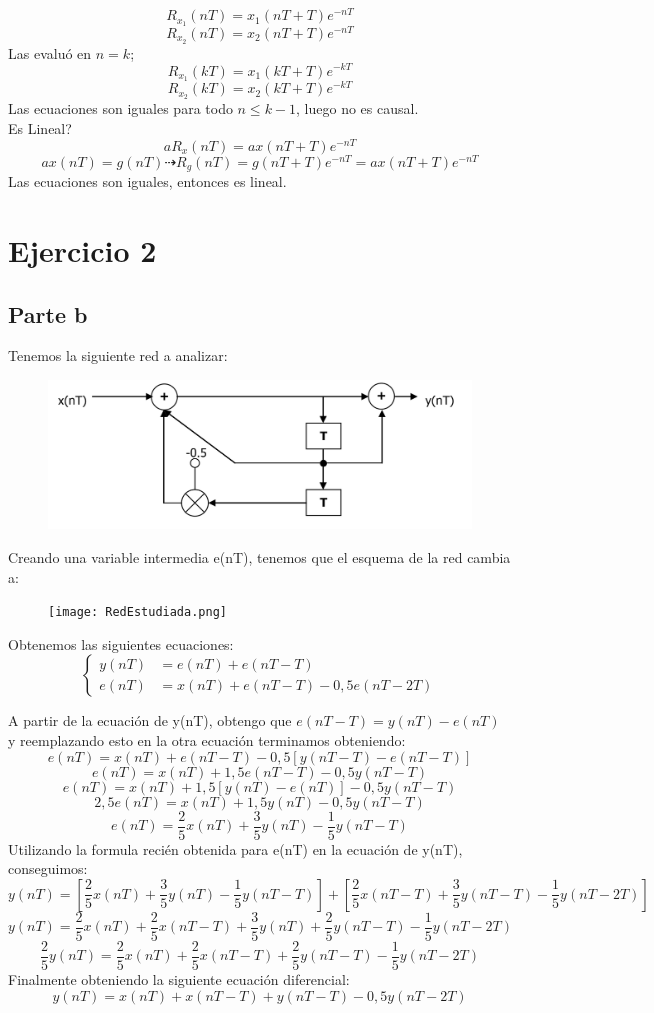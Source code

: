 \documentclass{report}
\begin{document}
$$R_{x_{1}}(nT) = x_1(nT+T)e^{-nT}$$
$$R_{x_{2}}(nT) = x_2(nT+T)e^{-nT}$$
Las evalu\'o en $n=k$;\\
$$R_{x_{1}}(kT) = x_1(kT+T)e^{-kT}$$
$$R_{x_{2}}(kT) = x_2(kT+T)e^{-kT}$$
Las ecuaciones son iguales para todo $n\leq k-1$, luego no es causal.\\
Es Lineal?\\
$$aR_x(nT) = ax(nT+T)e^{-nT}$$
$$ax(nT)=g(nT)\dashrightarrow R_g(nT) = g(nT+T)e^{-nT} = ax(nT+T)e^{-nT} $$
Las ecuaciones son iguales, entonces es lineal.\\

\chapter*{Ejercicio 2}

\section{Parte b}
Tenemos la siguiente red a analizar:
\begin{figure}[H]
    \centering
    \includegraphics[width = .5\textwidth]{Red.png}
    \label{fig:Red}
\end{figure}
Creando una variable intermedia e(nT), tenemos que el esquema de la red cambia a:
\begin{figure}[H]
    \centering
    \texttt{[image: RedEstudiada.png]}
    \label{fig:Red}
\end{figure}
Obtenemos las siguientes ecuaciones:\\
\begin{equation*}
\left\{
\begin{aligned}
y(nT) & = e(nT) + e(nT-T) \\
e(nT) & = x(nT) + e(nT-T) -0,5 e(nT-2T)
\end{aligned}
\right.
\end{equation*}

A partir de la ecuaci\'on de y(nT), obtengo que $e(nT-T)=y(nT)-e(nT)$ y reemplazando esto en la otra ecuaci\'on terminamos obteniendo:
$$e(nT)= x(nT) + e(nT-T) -0,5 [y(nT-T)-e(nT-T)]$$
$$e(nT)= x(nT) + 1,5e(nT-T) -0,5y(nT-T)$$
$$e(nT)= x(nT) + 1,5[y(nT)-e(nT)] -0,5y(nT-T)$$
$$2,5e(nT)= x(nT) + 1,5y(nT) -0,5y(nT-T)$$
$$e(nT)= \frac{2}{5} x(nT) + \frac{3}{5}y(nT) -\frac{1}{5}y(nT-T)$$
Utilizando la formula reci\'en obtenida para e(nT) en la ecuaci\'on de y(nT), conseguimos:
$$y(nT) = \left[ \frac{2}{5} x(nT) + \frac{3}{5}y(nT) -\frac{1}{5} y(nT-T)\right] + \left[ \frac{2}{5} x(nT-T) + \frac{3}{5} y(nT-T) -\frac{1}{5} y(nT-2T)\right]$$
$$y(nT) =  \frac{2}{5} x(nT)  + \frac{2}{5} x(nT-T) + \frac{3}{5}y(nT) + \frac{2}{5} y(nT-T) -\frac{1}{5} y(nT-2T)$$
$$\frac{2}{5}y(nT) =  \frac{2}{5} x(nT)  + \frac{2}{5} x(nT-T) + \frac{2}{5} y(nT-T) -\frac{1}{5} y(nT-2T)$$
Finalmente obteniendo la siguiente ecuación diferencial:
$$y(nT) =  x(nT)  + x(nT-T) + y(nT-T) -0,5 y(nT-2T)$$
\end{document}
